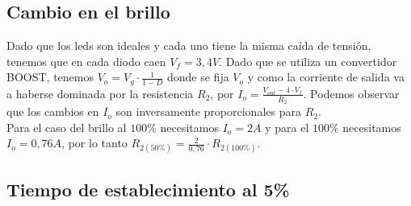 \documentclass[e4-tp2-main.tex]{subfiles}
\begin{document}
\subsection{Cambio en el brillo}

Dado que los leds son ideales y cada uno tiene la misma caída de tensión, tenemos que en cada diodo caen $V_f=3,4V$. Dado que se utiliza un convertidor BOOST, tenemos $V_o=V_g\cdot\frac{1}{1-D}$ donde se fija $V_o$ y como la corriente de salida va a haberse dominada por la resistencia $R_2$, por $I_o=\frac{V_{out}-4\cdot V_f}{R_2}$. Podemos observar que los cambios en $I_o$ son inversamente proporcionales para $R_2$.\\
Para el caso del brillo al $100\%$ necesitamos $I_o=2A$ y para el $100\%$ necesitamos $I_o=0,76 A$, por lo tanto $R_{2(50\%)}=\frac{2}{0,76}\cdot R_{2(100\%)}$.\\

\subsection{Tiempo de establecimiento al 5\%}
\end{document}
